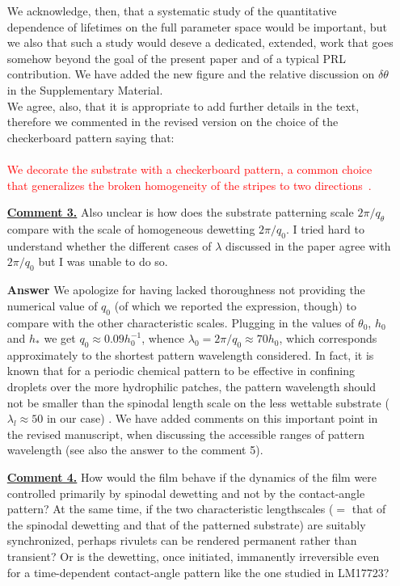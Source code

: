 \documentclass[12pt,english]{article}
\begin{document}
\begin{itemize}
{We acknowledge, then, that a systematic study of the quantitative dependence of 
lifetimes on the full parameter space would be important, but we also that such a study
would deseve a dedicated, extended, work that goes somehow beyond the goal of the present paper and of a typical PRL contribution.
We have added the new figure and the relative discussion on $\delta \theta$ in the
Supplementary Material.\\
We agree, also, that it is appropriate to add further details in the text, therefore we commented in the revised version on the choice of the checkerboard pattern saying that:\\
\\
\textcolor{red}{We decorate the substrate with a checkerboard pattern, a common choice that generalizes the broken homogeneity of the stripes to two 
directions~\cite{KarguptaLangmuir2003,Jalali2018,Nagayama2020,Das2020}.}

}

\item[ \textbf{\underline{Comment 3.}}]
{ 
Also unclear is how does the substrate patterning scale $2\pi/q_\theta$ compare with the scale of homogeneous dewetting $2\pi/q_0$.
I tried hard to understand whether the different cases of $\lambda$ discussed in the paper agree with $2\pi/q_0$ but I was unable to do so. 
}

\item[ \textbf{{Answer}}]
{
We apologize for having lacked thoroughness not providing the numerical 
value of $q_0$ (of which we reported the expression, though) to compare with the 
other characteristic scales. Plugging in the values of $\theta_0$,
$h_0$ and $h_{\ast}$ we get $q_0 \approx 0.09 h_0^{-1}$, whence 
$\lambda_0 = 2\pi/q_0 \approx 70 h_0$, which corresponds approximately to the shortest pattern wavelength considered. 
In fact, it is known that for a periodic chemical pattern to be effective in 
confining droplets over the more hydrophilic patches, the pattern wavelength should 
not be smaller than the spinodal length scale on the less wettable substrate
($\lambda_l \approx 50$ in our case) \cite{KarguptaJCP2002,KarguptaLangmuir2000,Nisato1999,Karim1998}.
We have added comments on this important point in the revised manuscript, when discussing the accessible ranges of pattern wavelength (see also the answer to the comment 5).
}

\item[ \textbf{\underline{Comment 4.}}]
{  
How would the film behave if the dynamics of the film were controlled primarily by spinodal dewetting and not by the contact-angle pattern?
At the same time, if the two characteristic lengthscales ($=$ that of the spinodal dewetting and that of the patterned substrate) are suitably synchronized, perhaps rivulets can be rendered permanent rather than transient? Or is the dewetting, once initiated, immanently irreversible even for a
time-dependent contact-angle pattern like the one studied in LM17723?
}


\end{itemize}
\end{document}
